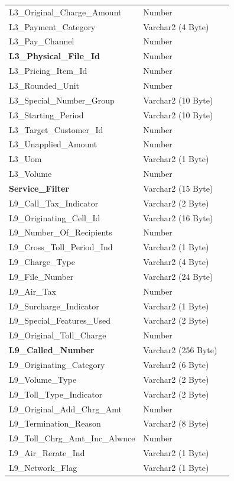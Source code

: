 \documentclass[12pt,twoside]{article}
\begin{document}
\begin{longtable}{l|l|l}
L3\_Original\_Charge\_Amount & Number & \\
L3\_Payment\_Category & Varchar2 (4 Byte) & \\
L3\_Pay\_Channel & Number & \\
\textbf{L3\_Physical\_File\_Id} & Number & \\
L3\_Pricing\_Item\_Id & Number & \\
L3\_Rounded\_Unit & Number & \\
L3\_Special\_Number\_Group & Varchar2 (10 Byte) & \\
L3\_Starting\_Period & Varchar2 (10 Byte) & \\
L3\_Target\_Customer\_Id & Number & \\
L3\_Unapplied\_Amount & Number & \\
L3\_Uom & Varchar2 (1 Byte) & \\
L3\_Volume & Number & \\
\textbf{Service\_Filter} & Varchar2 (15 Byte) & \\
L9\_Call\_Tax\_Indicator & Varchar2 (2 Byte) & \\
L9\_Originating\_Cell\_Id & Varchar2 (16 Byte) & \\
L9\_Number\_Of\_Recipients & Number & \\
L9\_Cross\_Toll\_Period\_Ind & Varchar2 (1 Byte) & \\
L9\_Charge\_Type & Varchar2 (4 Byte) & \\
L9\_File\_Number & Varchar2 (24 Byte) & \\
L9\_Air\_Tax & Number & \\
L9\_Surcharge\_Indicator & Varchar2 (1 Byte) & \\
L9\_Special\_Features\_Used & Varchar2 (2 Byte) & \\
L9\_Original\_Toll\_Charge & Number & \\
\textbf{L9\_Called\_Number} & Varchar2 (256 Byte) & \\
L9\_Originating\_Category & Varchar2 (6 Byte) & \\
L9\_Volume\_Type & Varchar2 (2 Byte) & \\
L9\_Toll\_Type\_Indicator & Varchar2 (2 Byte) & \\
L9\_Original\_Add\_Chrg\_Amt & Number & \\
L9\_Termination\_Reason & Varchar2 (8 Byte) & \\
L9\_Toll\_Chrg\_Amt\_Inc\_Alwnce & Number & \\
L9\_Air\_Rerate\_Ind & Varchar2 (1 Byte) & \\
L9\_Network\_Flag & Varchar2 (1 Byte) & \\

\end{longtable}
\end{document}
